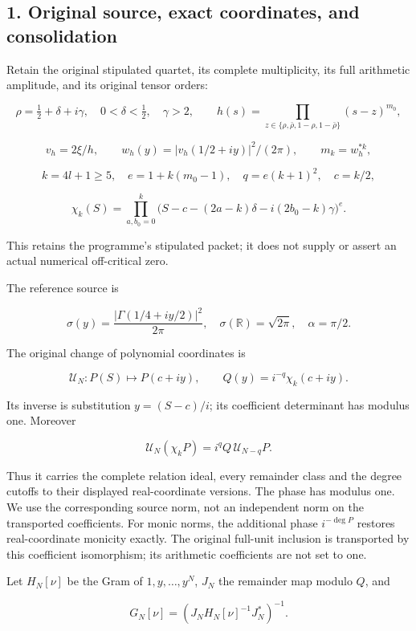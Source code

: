 \documentclass[11pt,a4paper]{article}
\begin{document}
\subsection{1. Original source, exact coordinates, and consolidation}\label{loc:original-source-exact-coordinates-and-consolidation}

Retain the original stipulated quartet, its complete multiplicity, its full arithmetic amplitude, and its original tensor orders:

\[
\rho=\tfrac12+\delta+i\gamma,\quad 0<\delta<\tfrac12,\quad\gamma>2,
\qquad h(s)=\prod_{z\in\{\rho,\bar\rho,1-\rho,1-\bar\rho\}}(s-z)^{m_0},
\]

\[
v_h=2\xi/h,\qquad w_h(y)=|v_h(1/2+iy)|^2/(2\pi),\qquad m_k=w_h^{*k},
\]

\[
k=4l+1\ge5,\quad e=1+k(m_0-1),\quad q=e(k+1)^2,\quad c=k/2,
\]

\[
\chi_k(S)=\prod_{a,b_0=0}^k
\bigl(S-c-(2a-k)\delta-i(2b_0-k)\gamma\bigr)^e.
\]

This retains the programme's stipulated packet; it does not supply or assert an actual numerical off-critical zero.

The reference source is

\[
\sigma(y)=\frac{|\Gamma(1/4+iy/2)|^2}{2\pi},\quad
\sigma(\mathbb R)=\sqrt{2\pi},\quad\alpha=\pi/2.
\]

The original change of polynomial coordinates is

\[
\mathcal U_N:P(S)\longmapsto P(c+iy),\qquad
Q(y)=i^{-q}\chi_k(c+iy).
\tag{C1}
\]

Its inverse is substitution \(y=(S-c)/i\); its coefficient determinant has modulus one. Moreover

\[
\mathcal U_N(\chi_kP)=i^q Q\,\mathcal U_{N-q}P.
\]

Thus it carries the complete relation ideal, every remainder class and the degree cutoffs to their displayed real-coordinate versions. The phase has modulus one. We use the corresponding source norm, not an independent norm on the transported coefficients. For monic norms, the additional phase \(i^{-\deg P}\) restores real-coordinate monicity exactly. The original full-unit inclusion is transported by this coefficient isomorphism; its arithmetic coefficients are not set to one.

Let \(H_N[\nu]\) be the Gram of \(1,y,\ldots,y^N\), \(J_N\) the remainder map modulo \(Q\), and

\[
G_N[\nu]=(J_NH_N[\nu]^{-1}J_N^*)^{-1}.
\]
\end{document}
